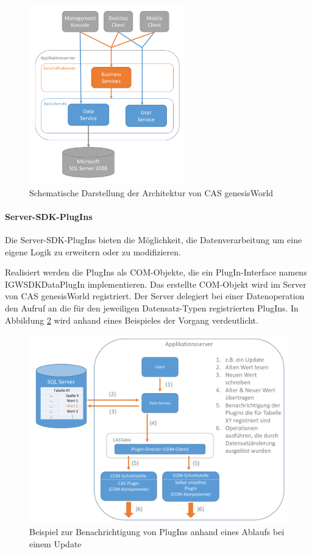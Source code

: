 \begin{figure}[H]
	\centering
  \includegraphics[width=0.6\textwidth, width=0.6\textwidth]{pics/GenesisWorld_Architektur.pdf}
	\caption{Schematische Darstellung der Architektur von CAS genesisWorld}
	\label{gw_Architektur}
\end{figure}

\paragraph{Server-SDK-PlugIns}

Die Server-SDK-PlugIns bieten die Möglichkeit, die Datenverarbeitung um eine eigene Logik zu erweitern oder zu modifizieren. 

Realisiert werden die PlugIns als COM-Objekte, die ein PlugIn-Interface namens IGWSDKDataPlugIn implementieren. Das erstellte COM-Objekt wird im Server von CAS genesisWorld registriert. Der Server delegiert bei einer Datenoperation den Aufruf an die für den jeweiligen Datensatz-Typen registrierten PlugIns. In Abbildung \ref{gw_plugin} wird anhand eines Beispieles der Vorgang verdeutlicht.

\begin{figure}[H]
	\centering
  \includegraphics[width=1.0\textwidth, width=1.0\textwidth]{pics/analyse_plugins.pdf}
	\caption{Beispiel zur Benachrichtigung von PlugIns anhand eines Ablaufs bei einem Update}
	\label{gw_plugin}
\end{figure}

